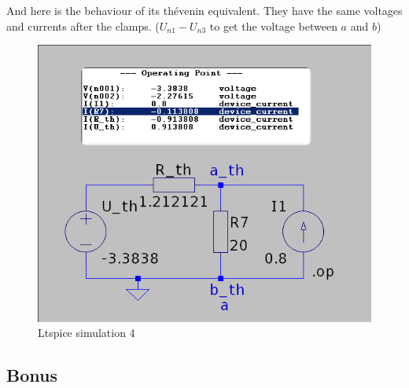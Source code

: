 \documentclass[a4paper]{article}
\begin{document}
\clearpage
And here is the behaviour of its thévenin equivalent. They have the same voltages and currents after
the clamps.
($U_{n1} -U_{n3}$ to get the voltage between $a$ and $b$) 
\begin{figure}[h!]\centering
   \includegraphics[scale=0.5]{./Figures/ltspice_equivalent.png} 
\caption{Ltspice simulation 4}
\label{fig:ltspice_4}
\end{figure}
\newpage
\subsection{Bonus}
\end{document}
